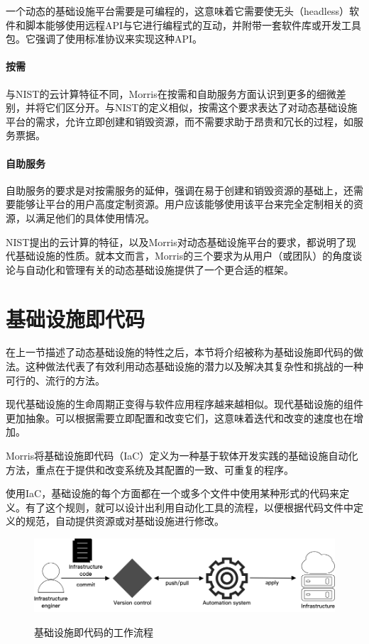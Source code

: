 \documentclass[macfonts,master]{njuthesis}
\begin{document}
一个动态的基础设施平台需要是可编程的，这意味着它需要使无头（headless）软件和脚本能够使用远程API与它进行编程式的互动，并附带一套软件库或开发工具包\cite{morris2016infrastructure}。它强调了使用标准协议来实现这种API。

\paragraph{按需}

与NIST的云计算特征不同，Morris在按需和自助服务方面认识到更多的细微差别，并将它们区分开。与NIST的定义相似，按需这个要求表达了对动态基础设施平台的需求，允许立即创建和销毁资源，而不需要求助于昂贵和冗长的过程，如服务票据\cite{morris2016infrastructure}。

\paragraph{自助服务}

自助服务的要求是对按需服务的延伸，强调在易于创建和销毁资源的基础上，还需要能够让平台的用户高度定制资源。用户应该能够使用该平台来完全定制相关的资源，以满足他们的具体使用情况\cite{morris2016infrastructure}。

NIST提出的云计算的特征，以及Morris对动态基础设施平台的要求，都说明了现代基础设施的性质。就本文而言，Morris的三个要求为从用户（或团队）的角度谈论与自动化和管理有关的动态基础设施提供了一个更合适的框架。

\section{基础设施即代码}
在上一节描述了动态基础设施的特性之后，本节将介绍被称为基础设施即代码的做法。这种做法代表了有效利用动态基础设施的潜力以及解决其复杂性和挑战的一种可行的、流行的方法。

现代基础设施的生命周期正变得与软件应用程序越来越相似。现代基础设施的组件更加抽象。可以根据需要立即配置和改变它们，这意味着迭代和改变的速度也在增加。

Morris将基础设施即代码（IaC）定义为一种基于软体开发实践的基础设施自动化方法，重点在于提供和改变系统及其配置的一致、可重复的程序\cite{morris2016infrastructure}。

使用IaC，基础设施的每个方面都在一个或多个文件中使用某种形式的代码来定义。有了这个规则，就可以设计出利用自动化工具的流程，以便根据代码文件中定义的规范，自动提供资源或对基础设施进行修改。

\begin{figure}[htbp]
  \centering
  \includegraphics[width= 1\textwidth]{pics/IaC.png}\\
  \caption{基础设施即代码的工作流程}\label{fig:IaC}
\end{figure}
\end{document}

